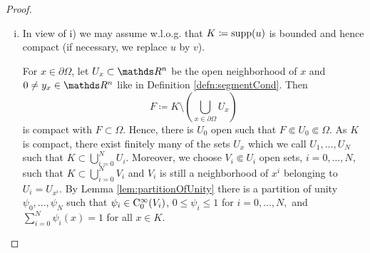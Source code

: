 \begin{proof}
\begin{enumerate}[i)]
    \item In view of i) we may assume w.l.o.g. that $K \coloneqq \operatorname{supp}(u)$ is bounded and hence compact (if necessary, we replace $u$ by $v$).

      For $x \in \partial\Omega$, let $U_x \subset \R^n$ be the open neighborhood of $x$ and $0 \neq y_x \in \R^n$ like in Definition \ref{defn:segmentCond}.
      Then
      $$
      F \coloneqq K \setminus ( \bigcup_{x \in \partial\Omega} U_x )
      $$
      is compact with $F \subset \Omega$.
      Hence, there is $U_0$ open such that $F \Subset U_0 \Subset \Omega$.
      As $K$ is compact, there exist finitely many of the sets $U_x$ which we call $U_1,\dots,U_N$ such that $K \subset \bigcup_{i = 0}^N U_i$.
      Moreover, we choose $V_i \Subset U_i$ open sets, $i = 0,\dots,N$, such that $K \subset \bigcup_{i = 0}^N V_i$ and $V_i$ is still a neighborhood of $x^i$ belonging to $U_i = U_{x^i}$.
      By Lemma \ref{lem:partitionOfUnity} there is a partition of unity $\psi_0,\dots,\psi_N$ such that $\psi_i \in \mathrm{C}_0^\infty(V_i)$, $0\leq \psi_i \leq 1$ for $i = 0,\dots,N,$ and $\sum_{i = 0}^N \psi_i(x) = 1$ for all $x \in K$.


\end{enumerate}
\end{proof}

